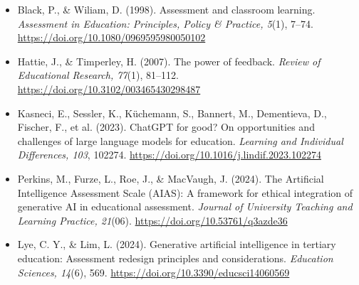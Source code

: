 \documentclass[12pt,letterpaper]{article}
\begin{document}
\begin{itemize}
  \item Black, P., \& Wiliam, D. (1998). Assessment and classroom
    learning. \textit{Assessment in Education: Principles, Policy \&
    Practice, 5}(1), 7--74. \url{https://doi.org/10.1080/0969595980050102}
  \item Hattie, J., \& Timperley, H. (2007). The power of feedback.
    \textit{Review of Educational Research, 77}(1), 81--112.
    \url{https://doi.org/10.3102/003465430298487}
  \item Kasneci, E., Sessler, K., Küchemann, S., Bannert, M.,
    Dementieva, D., Fischer, F., et al. (2023). ChatGPT for good? On
    opportunities and challenges of large language models for
    education. \textit{Learning and Individual Differences, 103},
    102274. \url{https://doi.org/10.1016/j.lindif.2023.102274}
  \item Perkins, M., Furze, L., Roe, J., \& MacVaugh, J. (2024). The
    Artificial Intelligence Assessment Scale (AIAS): A framework for
    ethical integration of generative AI in educational assessment.
    \textit{Journal of University Teaching and Learning Practice,
    21}(06). \url{https://doi.org/10.53761/q3azde36}
  \item Lye, C. Y., \& Lim, L. (2024). Generative artificial
    intelligence in tertiary education: Assessment redesign
    principles and considerations. \textit{Education Sciences,
    14}(6), 569. \url{https://doi.org/10.3390/educsci14060569}
\end{itemize}
\end{document}
